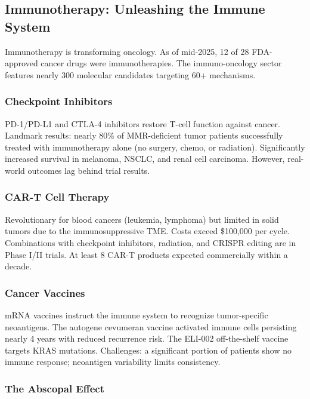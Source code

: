 \subsection{Immunotherapy: Unleashing the Immune
System}\label{immunotherapy-unleashing-the-immune-system}

Immunotherapy is transforming oncology. As of mid-2025, 12 of 28
FDA-approved cancer drugs were immunotherapies. The immuno-oncology
sector features nearly 300 molecular candidates targeting 60+
mechanisms.

\subsubsection{Checkpoint Inhibitors}\label{checkpoint-inhibitors}

PD-1/PD-L1 and CTLA-4 inhibitors restore T-cell function against cancer.
Landmark results: nearly 80\% of MMR-deficient tumor patients
successfully treated with immunotherapy alone (no surgery, chemo, or
radiation). Significantly increased survival in melanoma, NSCLC, and
renal cell carcinoma. However, real-world outcomes lag behind trial
results.

\subsubsection{CAR-T Cell Therapy}\label{car-t-cell-therapy}

Revolutionary for blood cancers (leukemia, lymphoma) but limited in
solid tumors due to the immunosuppressive TME. Costs exceed \$100,000
per cycle. Combinations with checkpoint inhibitors, radiation, and
CRISPR editing are in Phase I/II trials. At least 8 CAR-T products
expected commercially within a decade.

\subsubsection{Cancer Vaccines}\label{cancer-vaccines}

mRNA vaccines instruct the immune system to recognize tumor-specific
neoantigens. The autogene cevumeran vaccine activated immune cells
persisting nearly 4 years with reduced recurrence risk. The ELI-002
off-the-shelf vaccine targets KRAS mutations. Challenges: a significant
portion of patients show no immune response; neoantigen variability
limits consistency.

\subsubsection{The Abscopal Effect}\label{the-abscopal-effect}

